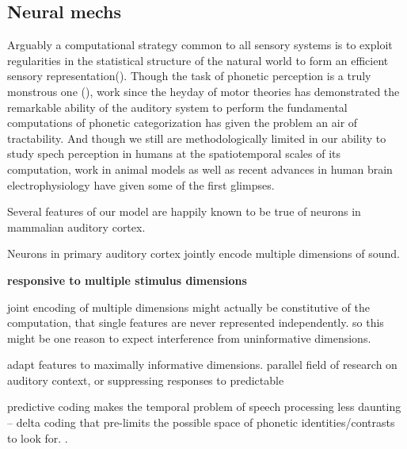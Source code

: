
\subsection{Neural mechs}

Arguably a computational strategy common to all sensory systems is to exploit regularities in the statistical structure of the natural world to form an efficient sensory representation\cite{kuhlBrainMechanismsEarly2010,kingRecentAdvancesUnderstanding2018a,smithEfficientAuditoryCoding2006a,stilpRapidEfficientCoding2010,schiavoCapacitiesNeuralMechanisms2019}(). Though the task of phonetic perception is a truly monstrous one (), work since the heyday of motor theories has demonstrated the remarkable ability of the auditory system to perform the fundamental computations of phonetic categorization has given the problem an air of tractability. And though we still are methodologically limited in our ability to study spech perception in humans at the spatiotemporal scales of its computation, work in animal models as well as recent advances in human brain electrophysiology have given some of the first glimpses. 

Several features of our model are happily known to be true of neurons in mammalian auditory cortex. 

Neurons in primary auditory cortex jointly encode multiple dimensions of sound. 

\textbf{responsive to multiple stimulus dimensions} \cite{sharpeeAnalyzingNeuralResponses2004,atencioMultidimensionalReceptiveField2017,walkerMultiplexedRobustRepresentations2011,bizleyInterdependentEncodingPitch2009b
}




joint encoding of multiple dimensions might actually be constitutive of the computation, that single features are never represented independently. \cite{macellaioWhySensoryNeurons2020} so this might be one reason to expect interference from uninformative dimensions.

adapt features to maximally informative dimensions\cite{Polley2006}. parallel field of research on auditory context, or suppressing responses to predictable 

predictive coding makes the temporal problem of speech processing less daunting -- delta coding that pre-limits the possible space of phonetic identities/contrasts to look for. .



